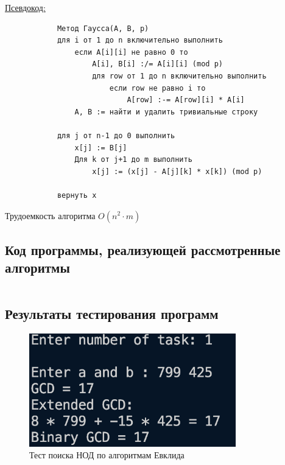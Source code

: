 \documentclass[bachelor, och, labwork]{SCWorks}
\begin{document}
            \underline{Псевдокод:}
            \begin{verbatim}
            Метод Гаусса(A, B, p)
            для i от 1 до n включительно выполнить
                если A[i][i] не равно 0 то
                    A[i], B[i] :/= A[i][i] (mod p)
                    для row от 1 до n включительно выполнить
                        если row не равно i то
                            A[row] :-= A[row][i] * A[i]
                A, B := найти и удалить тривиальные строку

            для j от n-1 до 0 выполнить
                x[j] := B[j]
                Для k от j+1 до m выполнить
                    x[j] := (x[j] - A[j][k] * x[k]) (mod p)
            
            вернуть x
            \end{verbatim}

            Трудоемкость алгоритма $O(n^2 \cdot m)$\\
    
    \subsection{Код программы, реализующей рассмотренные алгоритмы}

        \inputminted[breaklines,fontsize=\small,linenos]{python}{../code/lab1.py}

    \subsection{Результаты тестирования программ}
        \begin{figure}[H]
            \centering
            \includegraphics[width=0.8\textwidth]{pic/1.png}
            \caption{Тест поиска НОД по алгоритмам Евклида}
        \end{figure}
\end{document}
